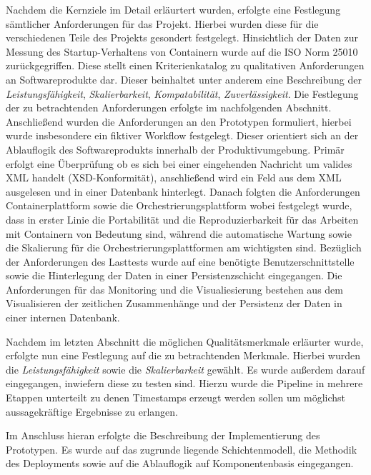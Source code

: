 Nachdem die Kernziele im Detail erläurtert wurden, erfolgte eine Festlegung sämtlicher Anforderungen für das Projekt. Hierbei wurden diese für die verschiedenen Teile des Projekts gesondert festgelegt. Hinsichtlich der Daten zur Messung des Startup-Verhaltens von Containern wurde auf die ISO Norm 25010 zurückgegriffen. Diese stellt einen Kriterienkatalog zu qualitativen Anforderungen an Softwareprodukte dar. Dieser beinhaltet unter anderem eine Beschreibung der \emph{Leistungsfähigkeit}, \emph{Skalierbarkeit}, \emph{Kompatabilität}, \emph{Zuverlässigkeit}. Die Festlegung der zu betrachtenden Anforderungen erfolgte im nachfolgenden Abschnitt. Anschließend wurden die Anforderungen an den Prototypen formuliert, hierbei wurde insbesondere ein fiktiver Workflow festgelegt. Dieser orientiert sich an der Ablauflogik des Softwareprodukts innerhalb der Produktivumgebung. Primär erfolgt eine Überprüfung ob es sich bei einer eingehenden Nachricht um valides XML handelt (XSD-Konformität), anschließend wird ein Feld aus dem XML ausgelesen und in einer Datenbank hinterlegt. Danach folgten die Anforderungen Containerplattform sowie die Orchestrierungsplattform wobei festgelegt wurde, dass in erster Linie die Portabilität und die Reproduzierbarkeit für das Arbeiten mit Containern von Bedeutung sind, während die automatische Wartung sowie die Skalierung für die Orchestrierungsplattformen am wichtigsten sind. Bezüglich der Anforderungen des Lasttests wurde auf eine benötigte Benutzerschnittstelle sowie die Hinterlegung der Daten in einer Persistenzschicht eingegangen. Die Anforderungen für das Monitoring und die Visualiesierung bestehen aus dem Visualisieren der zeitlichen Zusammenhänge und der Persistenz der Daten in einer internen Datenbank.

Nachdem im letzten Abschnitt die möglichen Qualitätsmerkmale erläurter wurde, erfolgte nun eine Festlegung auf die zu betrachtenden Merkmale. Hierbei wurden die \emph{Leistungsfähigkeit} sowie die \emph{Skalierbarkeit} gewählt. Es wurde außerdem darauf eingegangen, inwiefern diese zu testen sind. Hierzu wurde die Pipeline in mehrere Etappen unterteilt zu denen Timestamps erzeugt werden sollen um möglichst aussagekräftige Ergebnisse zu erlangen. 

Im Anschluss hieran erfolgte die Beschreibung der Implementierung des Prototypen. Es wurde auf das zugrunde liegende Schichtenmodell, die Methodik des Deployments sowie auf die Ablauflogik auf Komponentenbasis eingegangen. 

